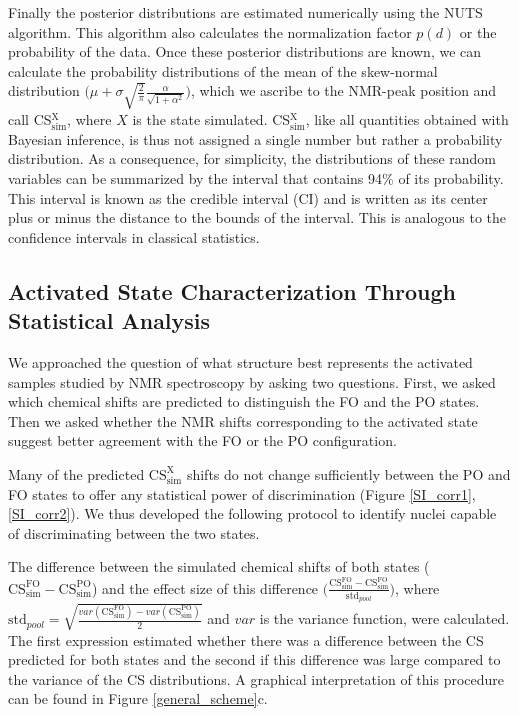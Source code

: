 \documentclass[%
 aip,
 amsmath,amssymb,
 preprint,%
]{revtex4-1}
\begin{document}
Finally the posterior distributions are estimated numerically using the NUTS\cite{sanjeevi2017nuts} algorithm. This algorithm also calculates the normalization factor $p(d)$ or the probability of the data. Once these posterior distributions are known, we can calculate the probability distributions of the mean of the skew-normal distribution $\big(\mu+\sigma\sqrt{\frac{2}{\pi}}\frac{\alpha}{\sqrt{1+\alpha^2}}\big)$, which we ascribe to the NMR-peak position and call CS$_{\text{sim}}^{\text{X}}$, where $X$ is the state simulated. CS$_{\text{sim}}^{\text{X}}$, like all quantities obtained with Bayesian inference, is thus not assigned a single number but rather a probability distribution. As a consequence, for simplicity, the distributions of these random variables can be summarized by the interval that contains 94$\%$ of its probability. This interval is known as the credible interval (CI) and is written as its center plus or minus the distance to the bounds of the interval. This is analogous to the confidence intervals in classical statistics.

\subsection{Activated State Characterization Through Statistical Analysis}

We approached the question of what structure best represents the activated samples studied by NMR spectroscopy by asking two questions. First, we asked which chemical shifts are predicted to distinguish the FO and the PO states. Then we asked whether the NMR shifts corresponding to the activated state suggest better agreement with the FO or the PO configuration.

Many of the predicted ${\text{CS}}_{\text{sim}}^{\text{X}}$ shifts do not change sufficiently between the PO and FO states to offer any statistical power of discrimination (Figure \ref{SI_corr1},\ref{SI_corr2}). We thus developed the following protocol to identify nuclei capable of discriminating between the two states.

The difference between the simulated chemical shifts of both states ($\text{CS}_{\text{sim}}^{\text{FO}}-\text{CS}_{\text{sim}}^{\text{PO}}$) and the effect size of this difference $\big(\frac{\text{CS}_{\text{sim}}^{\text{FO}}-\text{CS}_{\text{sim}}^{\text{FO}}}{\text{std}_{pool}}\big)$, where $\text{std}_{pool} =\sqrt{\frac{var(\text{CS}_{\text{sim}}^{\text{FO}})-var(\text{CS}_{\text{sim}}^{\text{PO}})}{2}}$ and $var$ is the variance function, were calculated. The first expression estimated whether there was a difference between the CS predicted for both states and the second if this difference was large compared to the variance of the CS distributions. A graphical interpretation of this procedure can be found in Figure \ref{general_scheme}c.
\end{document}
